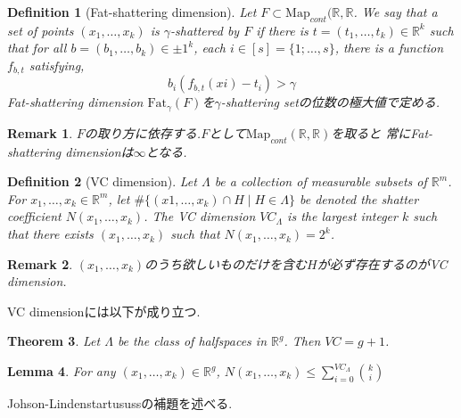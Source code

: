 \documentclass{jarticle}
\newtheorem{thm}{Theorem}[section]
\newtheorem{dfn}[thm]{Definition}
\newtheorem{lem}[thm]{Lemma}
\newtheorem*{rem}{Remark}
\begin{document}
\begin{dfn}[Fat-shattering dimension]
  Let $F \subset \mathrm{Map}_{cont}(\mathbb{R},\mathbb{R}$.
  We say that a set of points $(x_1, \dots, x_k)$ is $\gamma$-shattered by $F$
  if there is $t = (t_1, \dots,t_k) \in \mathbb{R}^k$ such that for all
  $b = (b_1, \dots,b_k) \in {\pm 1}^k$, each $i \in [s]= \{1; \dots,s\}$,
   there is a function $f_{b,t}$ satisfying,
   \begin{equation*}
     b_i (f_{b,t}(xi) - t_i) >  \gamma
   \end{equation*}
  Fat-shattering dimension $\mathrm{Fat}_{\gamma}(F)$を$\gamma$-shattering setの位数の極大値で定める.
\end{dfn}
\begin{rem}
 $F$の取り方に依存する.$F$として$\mathrm{Map}_{cont}(\mathbb{R},\mathbb{R})$を取ると
 常にFat-shattering dimensionは$\infty$となる.
\end{rem}

\begin{dfn}[VC dimension]
Let $\Lambda$ be a collection of measurable subsets of $\mathbb{R}^m$.
For $x_1,\dots,x_k \in \mathbb{R}^m$,
let $\#\{(x1, \dots ,x_k) \cap H \mid H \in \Lambda\}$ be denoted the shatter coefficient $N(x_1, \dots, x_k)$.
The VC dimension $VC_{\Lambda}$
is the largest integer $k$ such that there exists $(x_1, \dots,x_k)$ such that $N(x_1,\dots, x_k) = 2^k$.
\end{dfn}
\begin{rem}
 $(x_1,\dots,x_k)$のうち欲しいものだけを含む$H$が必ず存在するのがVC dimension.
\end{rem}
VC dimensionには以下が成り立つ.
\begin{thm}
\label{vc}
 Let $\Lambda$ be the class of halfspaces in $\mathbb{R}^g$. Then $VC= g + 1$.
\end{thm}
\begin{lem}
  For any $(x_1,\dots, x_k) \in  \mathbb{R}^g$,
  $N(x_1,\dots, x_k)  \le \sum_{i=0}^{VC_{\Lambda}}  \binom{k}{i}$
\end{lem}

Johson-Lindenstartusussの補題を述べる.
\end{document}
